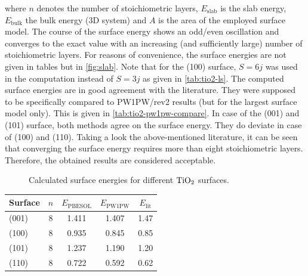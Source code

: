 \documentclass[a4paper,12pt,parskip=half]{scrartcl}
\begin{document}
where $ n $ denotes the number of stoichiometric layers, $ E_\mathrm{slab} $ is the slab energy, $ E_\mathrm{bulk} $ the bulk energy (3D system) and $ A $ is the area of the employed surface model. The course of the surface energy shows an odd/even oscillation and converges to the exact value with an increasing (and sufficiently large) number of stoichiometric layers. For reasons of convenience, the surface energies are not given in tables but in \autoref{fig:slab}. Note that for the (100) surface, $ S = 6j $ was used in the computation instead of $ S=3j $ as given in \autoref{tab:tio2-ls}. The computed surface energies are in good agreement with the literature.\autocite{rutile-surface-energy} They were supposed to be specifically compared to PW1PW/rev2 results (but for the largest surface model only). This is given in \autoref{tab:tio2-pw1pw-compare}. In case of the (001) and (101) surface, both methods agree on the surface energy. They do deviate in case of (100) and (110). Taking a look the above-mentioned literature, it can be seen that converging the surface energy requires more than eight stoichiometric layers. Therefore, the obtained results are considered acceptable.

\begin{figure}
	\centering
	
	\vspace{-20pt}
	\caption{Calculated surface energies for different $ \ce{TiO2} $ surfaces.}
	\label{fig:slab}
\end{figure}
%
\begin{table}
	\centering
	\label{tab:tio2-pw1pw-compare}
	\begin{tabular}{lcccc}
		\toprule
		Surface & $n$ & $ E_\mathrm{PBESOL}$ & $ E_\mathrm{PW1PW} $ & $ E_\mathrm{lit} $ \\
		\midrule
		(001)   & 8   & 1.411                & 1.407                & 1.47               \\
		(100)   & 8   & 0.935                & 0.845                & 0.85               \\
		(101)   & 8   & 1.237                & 1.190                & 1.20               \\
		(110)   & 8   & 0.722                & 0.592                & 0.62               \\
		\bottomrule
	\end{tabular}
\end{table}
\end{document}
